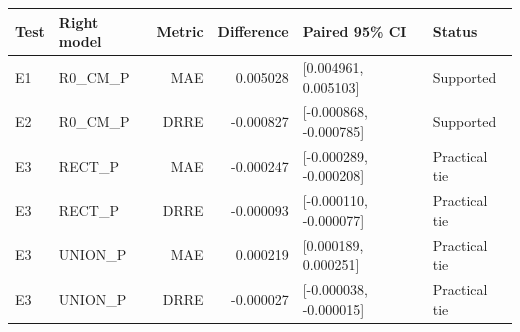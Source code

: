 \begin{center}
\begin{minipage}{\linewidth}
\centering
\small
\setlength{\tabcolsep}{4pt}
\label{tab:coco-contrasts}
\begin{tabular}{llrrll}
\toprule
Test & Right model & Metric & Difference & Paired 95\% CI & Status \\
\midrule
E1 & R0\_CM\_P & MAE & 0.005028 & [0.004961, 0.005103] & Supported \\
E2 & R0\_CM\_P & DRRE & -0.000827 & [-0.000868, -0.000785] & Supported \\
E3 & RECT\_P & MAE & -0.000247 & [-0.000289, -0.000208] & Practical tie \\
E3 & RECT\_P & DRRE & -0.000093 & [-0.000110, -0.000077] & Practical tie \\
E3 & UNION\_P & MAE & 0.000219 & [0.000189, 0.000251] & Practical tie \\
E3 & UNION\_P & DRRE & -0.000027 & [-0.000038, -0.000015] & Practical tie \\
\bottomrule
\end{tabular}
\end{minipage}
\end{center}
